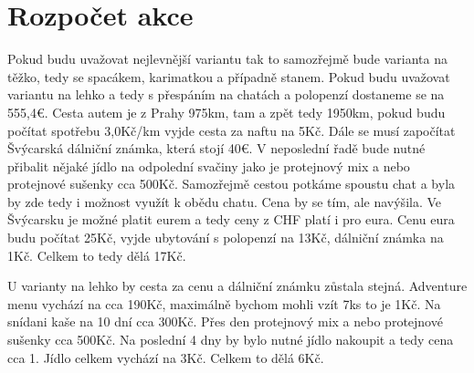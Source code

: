 \chapter{Rozpočet akce}
\label{Rozpocet_akce}
\def\figurename{Obr.} %
\def\tablename{Tab.} %
\def\figureautorefname{obr.} %
\def\tableautorefname{tab.} %
\def\chapterautorefname{kapitola} %

Pokud budu uvažovat nejlevnější variantu tak to samozřejmě bude varianta na těžko, tedy se spacákem, karimatkou a případně stanem. Pokud budu uvažovat variantu na lehko a tedy s přespáním na chatách a polopenzí dostaneme se na 555,4\:€. Cesta autem je z Prahy 975\:km, tam a zpět tedy 1950\:km, pokud budu počítat spotřebu 3,0\:Kč/km vyjde cesta za naftu na 5\:Kč. Dále se musí započítat Švýcarská dálniční známka, která stojí 40\:€. V neposlední řadě bude nutné přibalit nějaké jídlo na odpolední svačiny jako je protejnový mix a nebo protejnové sušenky cca 500\:Kč. Samozřejmě cestou potkáme spoustu chat a byla by zde tedy i možnost využít k obědu chatu. Cena by se tím, ale navýšila. Ve Švýcarsku je možné platit eurem a tedy ceny z CHF platí i pro eura. Cenu eura budu počítat 25\:Kč, vyjde ubytování s polopenzí na 13\:Kč, dálniční známka na 1\:Kč. Celkem to tedy dělá 17\:Kč.

U varianty na lehko by cesta za cenu a dálniční známku zůstala stejná. Adventure menu vychází na cca 190\:Kč, maximálně bychom mohli vzít 7\:ks to je 1\:Kč. Na snídani kaše na 10 dní cca 300\:Kč. Přes den protejnový mix a nebo protejnové sušenky cca 500\:Kč. Na poslední 4 dny by bylo nutné jídlo nakoupit a tedy cena cca 1. Jídlo celkem vychází na 3\:Kč. Celkem to dělá 6\:Kč.